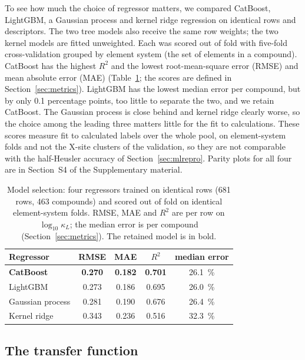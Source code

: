 To see how much the choice of regressor matters, we compared CatBoost, LightGBM, a Gaussian process
and kernel ridge regression on identical rows and descriptors. The two tree models also receive the
same row weights; the two kernel models are fitted unweighted. Each was scored out of fold
with five-fold cross-validation grouped by element system (the set of elements in a compound). CatBoost has the highest $R^2$ and the lowest root-mean-square error (RMSE) and mean absolute error (MAE) (Table~\ref{tab:models}; the scores are
defined in Section~\ref{sec:metrics}).
LightGBM has the lowest median error per compound, but by only \num{0.1} percentage points, too
little to separate the two, and we retain CatBoost. The Gaussian process is close behind and kernel
ridge clearly worse, so the choice among the leading three matters little for the fit to
calculations. These scores measure fit to calculated labels over the whole pool, on element-system
folds and not the X-site clusters of the validation, so they are not comparable with the
half-Heusler accuracy of Section~\ref{sec:mlrepro}. Parity plots for all four are in Section~S4 of
the Supplementary material.

\begin{table}[tbp]
  \centering
  \caption{Model selection: four regressors trained on identical rows (\num{681} rows, \num{463}
  compounds) and scored out of fold on identical element-system folds. RMSE, MAE and $R^2$ are per
  row on $\log_{10}\kappa_L$; the median error is per compound
  (Section~\ref{sec:metrics}). The retained model is in bold.}
  \label{tab:models}
  \small
  \begin{tabular}{lcccc}
    \toprule
    Regressor & RMSE & MAE & $R^2$ & median error \\
    \midrule
    \textbf{CatBoost}  & \textbf{\num{0.270}} & \textbf{\num{0.182}} & \textbf{\num{0.701}} & \SI{26.1}{\percent} \\
    LightGBM           & \num{0.273} & \num{0.186} & \num{0.695} & \SI{26.0}{\percent} \\
    Gaussian process   & \num{0.281} & \num{0.190} & \num{0.676} & \SI{26.4}{\percent} \\
    Kernel ridge       & \num{0.343} & \num{0.236} & \num{0.516} & \SI{32.3}{\percent} \\
    \bottomrule
  \end{tabular}
\end{table}

\subsection{The transfer function}
\label{sec:transfer}

